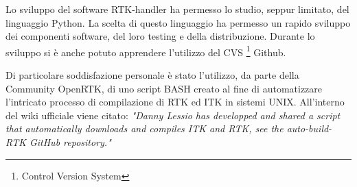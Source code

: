 \documentclass[a4paper,12pt, doubleside]{report}
\begin{document}
            \bigskip
            \par
                Lo sviluppo del software RTK-handler ha permesso lo studio, seppur limitato, del linguaggio Python. La scelta di questo linguaggio ha permesso un rapido sviluppo dei componenti software, del loro testing e della distribuzione. Durante lo sviluppo si è anche potuto apprendere l'utilizzo del CVS \footnote{Control Version System} Github.
            
            \bigskip
            \par
                Di particolare soddisfazione personale è stato l'utilizzo, da parte della Community OpenRTK, di uno script BASH creato al fine di automatizzare l'intricato processo di compilazione di RTK ed ITK in sistemi UNIX. All'interno del wiki ufficiale viene citato:
                \textit{"Danny Lessio has developped and shared a script that automatically downloads and compiles ITK and RTK, see the auto-build-RTK GitHub repository."} \cite{wiki-rtk}
             
\end{document}
